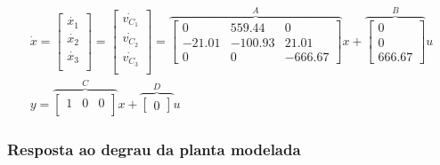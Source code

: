 \documentclass[
	12pt,				%
	article,			%
	openright,			%
	oneside,
	a4paper,			%
	chapter=TITLE,		%
	section=TITLE,		%
	english,			%
	french,				%
	spanish,			%
	brazil,				%
]{abntex2}
\begin{document}
        	\begin{eqnarray}
        	    \nonumber
                \dot{x} = 
                \begin{bmatrix}
                    \dot{x_1} \\
                    \dot{x_2} \\
                    \dot{x_3} \\
                \end{bmatrix} = 
                \begin{bmatrix}
                    \dot{v_{C_1}} \\
                    \dot{v_{C_2}} \\
                    \dot{v_{C_3}} \\
                \end{bmatrix} =
                \overbrace{
                    \begin{bmatrix}
                        0 & 559.44 & 0 \\
                        -21.01 & -100.93 & 21.01 \\
                        0 & 0 & -666.67
                    \end{bmatrix}}^{A} x
                +
                \overbrace{
                    \begin{bmatrix}
                        0 \\
                        0 \\
                        666.67
                    \end{bmatrix}}^{B} u \\
                \label{eq-ssplanta_final}
                y = 
                \overbrace{
                    \begin{bmatrix}
                        1 & 0 & 0 \\
                    \end{bmatrix}}^{C} x
                +
                \overbrace{
                    \begin{bmatrix}
                        0
                    \end{bmatrix}}^{D} u
            \end{eqnarray}
            
        \subsubsection{Resposta ao degrau da planta modelada}
        
\end{document}
